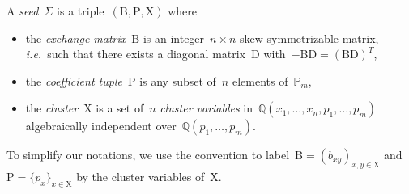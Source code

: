 \documentclass{amsart}
\theoremstyle{definition}
\newcommand{\Q}{\mathbb{Q}} %
\newcommand{\ie}{\textit{i.e.}~} %
\newcommand{\darkblue}{\color{darkblue}} %
\newcommand{\defn}[1]{\textsl{\darkblue #1}} %
\newcommand{\Trop}[1]{\mathbb{P}_{#1}} %
\newcommand{\seed}{\Sigma} %
\newcommand{\cluster}{\mathrm{X}} %
\newcommand{\coefficients}{\mathrm{P}} %
\newcommand{\B}{\mathrm{B}} %
\newcommand{\D}{\mathrm{D}} %
\begin{document}
\medskip
A \defn{seed}~$\seed$ is a triple~$(\B, \coefficients, \cluster)$ where
\begin{itemize}
\item the \defn{exchange matrix}~$\B$ is an integer~$n \times n$ skew-symmetrizable matrix, \ie such that there exists a diagonal matrix~$\D$ with~$-\B\D = (\B\D)^T$,
\item the \defn{coefficient tuple}~$\coefficients$ is any subset of~$n$ elements of~$\Trop{m}$,
\item the \defn{cluster}~$\cluster$ is a set of~$n$ \defn{cluster variables} in~$\Q(x_1, \dots, x_n, p_1, \dots, p_m)$ algebraically independent over~$\Q(p_1, \dots, p_m)$.
\end{itemize}
To simplify our notations, we use the convention to label~$\B = (b_{xy})_{x,y \in \cluster}$ and~$\coefficients = \{p_x\}_{x \in \cluster}$ by the cluster variables of~$\cluster$.
\end{document}
